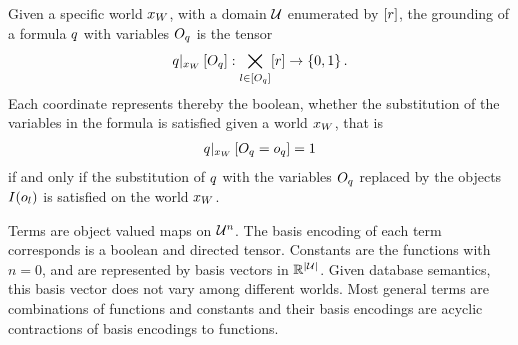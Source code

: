\begin{definition}
    Given a specific world $x_{W}$, with a domain $\mathcal{U}$ enumerated by $[r]$, the grounding of a formula $q$ with variables $O_{q}$  is the tensor
    \begin{align*}
        {q}|_{x_{W}} \left[O_{q}\right] :
        \bigtimes_{l\in[O_{q}]} [r] \rightarrow \{0,1\} \, .
    \end{align*}
    Each coordinate represents thereby the boolean, whether the substitution of the variables in the formula is satisfied given a world $x_{W}$, that is
    \begin{align*}
        {q}|_{x_{W}} \left[O_{q}=o_{q}\right] = 1
    \end{align*}
    if and only if the substitution of $q$ with the variables $O_{q}$ replaced by the objects $I(o_{l})$ is satisfied on the world $x_{W}$.
\end{definition}




Terms are object valued maps on $\mathcal{U}^{n}$.
The basis encoding of each term corresponds is a boolean and directed tensor.
Constants are the functions with $n=0$, and are represented by basis vectors in $\mathbb{R}^{\left|\mathcal{U}\right|}$.
Given database semantics, this basis vector does not vary among different worlds.
Most general terms are combinations of functions and constants and their basis encodings are acyclic contractions of basis encodings to functions.



